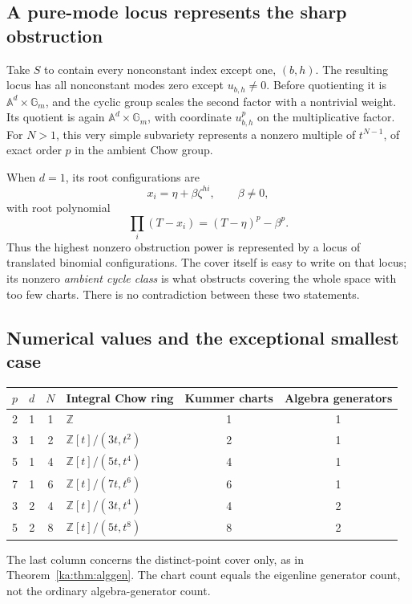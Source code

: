 \documentclass[11pt,a4paper]{article}
\theoremstyle{definition}
\theoremstyle{remark}
\newcommand{\Z}{\mathbb Z}
\newcommand{\A}{\mathbb A}
\begin{document}
\subsection{A pure-mode locus represents the sharp obstruction}
Take $S$ to contain every nonconstant index except one, $(b,h)$.
The resulting locus has all nonconstant modes zero except
$u_{b,h}\neq0$. Before quotienting it is $\A^d\times\mathbb G_m$,
and the cyclic group scales the second factor with a nontrivial weight.
Its quotient is again $\A^d\times\mathbb G_m$, with coordinate
$u_{b,h}^p$ on the multiplicative factor. For $N>1$, this very simple
subvariety represents a nonzero multiple of $t^{N-1}$, of exact order
$p$ in the ambient Chow group.

When $d=1$, its root configurations are
\[
 x_i=\eta+\beta\zeta^{hi},\qquad \beta\neq0,
\]
with root polynomial
\begin{equation}
 \prod_i(T-x_i)=(T-\eta)^p-\beta^p.
 \label{ka:eq:binomiallocus}
\end{equation}
Thus the highest nonzero obstruction power is represented by a locus of
translated binomial configurations. The cover itself is easy to write
on that locus; its nonzero \emph{ambient cycle class} is what obstructs
covering the whole space with too few charts. There is no contradiction
between these two statements.

\subsection{Numerical values and the exceptional smallest case}
\begin{center}
\begin{tabular}{@{}ccclcc@{}}
\toprule
$p$ & $d$ & $N$ & Integral Chow ring & Kummer charts & Algebra generators\\
\midrule
2 & 1 & 1 & $\Z$ & 1 & 1\\
3 & 1 & 2 & $\Z[t]/(3t,t^2)$ & 2 & 1\\
5 & 1 & 4 & $\Z[t]/(5t,t^4)$ & 4 & 1\\
7 & 1 & 6 & $\Z[t]/(7t,t^6)$ & 6 & 1\\
3 & 2 & 4 & $\Z[t]/(3t,t^4)$ & 4 & 2\\
5 & 2 & 8 & $\Z[t]/(5t,t^8)$ & 8 & 2\\
\bottomrule
\end{tabular}
\end{center}
The last column concerns the distinct-point cover only, as in
Theorem~\ref{ka:thm:alggen}. The chart count equals the eigenline generator
count, not the ordinary algebra-generator count.
\end{document}
